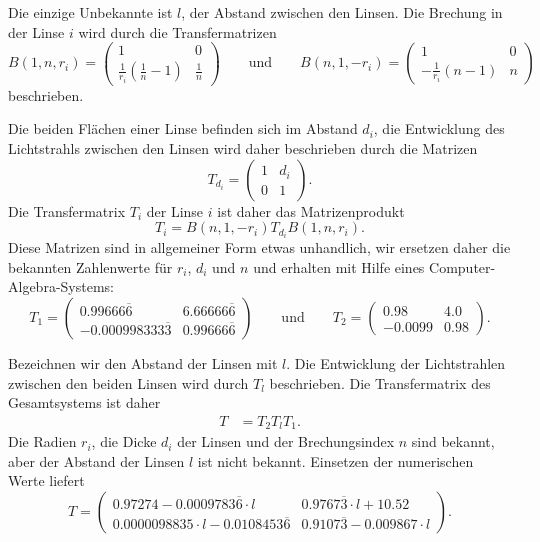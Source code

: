 \begin{loesung}
Die einzige Unbekannte ist $l$, der Abstand zwischen den Linsen.
Die Brechung in der Linse $i$ wird durch die Transfermatrizen
\[
B(1,n,r_i)
=
\begin{pmatrix}
1 & 0 \\
\frac1{r_i}(\frac{1}{n}-1) & \frac1{n}
\end{pmatrix}
\qquad\text{und}\qquad
B(n,1,-r_i)
=
\begin{pmatrix}
1&0\\
-\frac1{r_i}(n-1) & n
\end{pmatrix}
\]
beschrieben.

Die beiden Flächen einer Linse befinden sich im Abstand $d_i$, die
Entwicklung des Lichtstrahls zwischen den Linsen wird daher beschrieben
durch die Matrizen
\[
T_{d_i} = \begin{pmatrix} 1&d_i\\0&1\end{pmatrix}.
\]
Die Transfermatrix $T_i$ der Linse $i$ ist daher das Matrizenprodukt
\begin{equation}
T_i
=
B(n,1,-r_i)
T_{d_i}
B(1,n,r_i).
\label{10000059:linse}
\end{equation}
Diese Matrizen sind in allgemeiner Form etwas unhandlich, wir ersetzen
daher die bekannten Zahlenwerte für $r_i$, $d_i$ und $n$ und erhalten
mit Hilfe eines Computer-Algebra-Systems:
\begin{equation}
T_1
=
\begin{pmatrix}
  0.99666\overline{6}& 6.66666\overline{6}  \\
- 0.000998333\overline{3} & 0.99666\overline{6}
\end{pmatrix}
\qquad\text{und}\qquad
T_2
=
\begin{pmatrix}
 0.98 & 4.0 \\
-0.0099 & 0.98
\end{pmatrix}.
\label{10000059:linsen}
\end{equation}

Bezeichnen wir den Abstand der Linsen mit $l$.
Die Entwicklung der Lichtstrahlen zwischen den beiden Linsen wird
durch $T_l$ beschrieben.
Die Transfermatrix des Gesamtsystems ist daher
\begin{align*}
T
&=
T_2 T_l T_1.
\end{align*}
Die Radien $r_i$, die Dicke $d_i$ der Linsen und der Brechungsindex $n$
sind bekannt, aber der Abstand der Linsen $l$ ist nicht bekannt.
Einsetzen der numerischen Werte liefert 
\begin{equation}
T
=
\begin{pmatrix}
0.97274 - 0.0009783\overline{6}\cdot  l      & 0.9767\overline{3}\cdot  l + 10.52 \\
0.0000098835\cdot  l - 0.0108453\overline{6} & 0.9107\overline{3} - 0.009867\cdot l
\end{pmatrix}.
\label{10000059:gesamt}
\end{equation}



\end{loesung}
